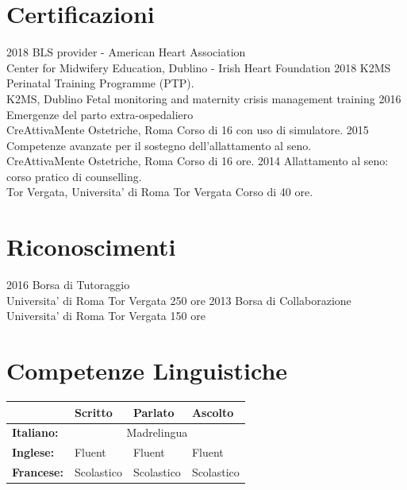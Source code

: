 \documentclass[11pt]{friggeri-cv}
\begin{document}
\section{Certificazioni}
\begin{entrylist}
  \entry
    {2018}
    {BLS provider - American Heart Association}
    {\\Center for Midwifery Education, Dublino - Irish Heart Foundation}
    {}
  \entry
    {2018}
    {K2MS Perinatal Training Programme (PTP).}
    {\\K2MS, Dublino}
    {Fetal monitoring and maternity crisis management training}
  \entry
	  {2016}
	  {Emergenze del parto extra-ospedaliero}
	  {\\CreAttivaMente Ostetriche, Roma}
	  {Corso di 16 con uso di simulatore.}
  \entry
	  {2015}
	  {Competenze avanzate per il sostegno dell’allattamento al seno.}
	  {\\CreAttivaMente Ostetriche, Roma }
	  {Corso di 16 ore.}
  \entry
  {2014}
  {Allattamento al seno: corso pratico di counselling.}
  {\\Tor Vergata, Universita' di Roma Tor Vergata}
  {Corso di 40 ore.}
\end{entrylist}

\vspace{-20pt}
\section{Riconoscimenti}
\begin{entrylist}
  \entry
    {2016}
    {Borsa di Tutoraggio}
    {\\Universita' di Roma Tor Vergata}
    {250 ore}
  \entry
    {2013}
    {Borsa di Collaborazione}
    {\\Universita' di Roma Tor Vergata}
    {150 ore}
\end{entrylist}

\vspace{-20pt}
\section{Competenze Linguistiche}
\begin{table}[!h]
	\centering
  \renewcommand{\arraystretch}{1.45}
	\begin{tabular}{ p{3cm} p{3cm} p{3cm} p{3cm} }
    \hline
		& \textbf{Scritto} 	& \textbf{Parlato} & \textbf{Ascolto}			\\     \hline
		\textbf{Italiano:}	& \multicolumn{3}{c}{Madrelingua}					\\     
		\textbf{Inglese:} 	& Fluent & Fluent & Fluent \\   
		\textbf{Francese:}	& Scolastico	& Scolastico	& Scolastico \\    \hline
	\end{tabular}
\end{table}
\newpage
\end{document}
